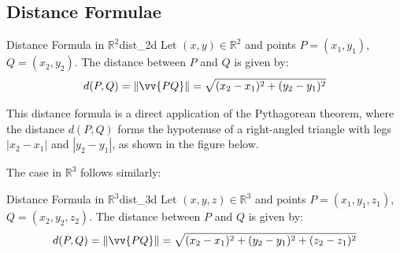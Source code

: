 \subsection{Distance Formulae}

\begin{definition}{Distance Formula in $\mathbb{R}^2$}{dist_2d}
Let $(x,y) \in \mathbb{R}^2$ and points $P=(x_1,y_1)$, $Q=(x_2,y_2)$. The distance between $P$ and $Q$ is given by:
\[
d(P,Q) = \norm{\vv{PQ}} = \sqrt{(x_2-x_1)^2 + (y_2-y_1)^2}
\]
\end{definition}

This distance formula is a direct application of the Pythagorean theorem, where the distance $d(P,Q)$ forms the hypotenuse of a right-angled triangle with legs $|x_2 - x_1|$ and $|y_2 - y_1|$, as shown in the figure below.

\begin{center}
\end{center}

The case in $\mathbb{R}^3$ follows similarly:

\begin{definition}{Distance Formula in $\mathbb{R}^3$}{dist_3d}
Let $(x,y,z) \in \mathbb{R}^3$ and points $P=(x_1,y_1,z_1)$, $Q=(x_2,y_2,z_2)$. The distance between $P$ and $Q$ is given by:
\[
d(P,Q) = \norm{\vv{PQ}} = \sqrt{(x_2-x_1)^2 + (y_2-y_1)^2 + (z_2-z_1)^2}
\]
\end{definition}

